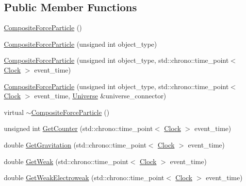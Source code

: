\subsection*{Public Member Functions}
\begin{DoxyCompactItemize}
\item 
\mbox{\hyperlink{class_composite_force_particle_ae00ad8621af6155c86ee3205c1e2afdb}{Composite\+Force\+Particle}} ()
\item 
\mbox{\hyperlink{class_composite_force_particle_a967036ded4212fcd6d4213275145dc50}{Composite\+Force\+Particle}} (unsigned int object\+\_\+type)
\item 
\mbox{\hyperlink{class_composite_force_particle_a805886058bba3179de8142fd266883e4}{Composite\+Force\+Particle}} (unsigned int object\+\_\+type, std\+::chrono\+::time\+\_\+point$<$ \mbox{\hyperlink{universe_8h_a0ef8d951d1ca5ab3cfaf7ab4c7a6fd80}{Clock}} $>$ event\+\_\+time)
\item 
\mbox{\hyperlink{class_composite_force_particle_a8c311b3e35f6def3a532346a50c15281}{Composite\+Force\+Particle}} (unsigned int object\+\_\+type, std\+::chrono\+::time\+\_\+point$<$ \mbox{\hyperlink{universe_8h_a0ef8d951d1ca5ab3cfaf7ab4c7a6fd80}{Clock}} $>$ event\+\_\+time, \mbox{\hyperlink{class_universe}{Universe}} \&universe\+\_\+connector)
\item 
virtual \mbox{\hyperlink{class_composite_force_particle_aa35ee4244375b2bcc5dd775de30aa39e}{$\sim$\+Composite\+Force\+Particle}} ()
\item 
unsigned int \mbox{\hyperlink{class_composite_force_particle_ae0bc57309f04b784b2c23b82db869b25}{Get\+Counter}} (std\+::chrono\+::time\+\_\+point$<$ \mbox{\hyperlink{universe_8h_a0ef8d951d1ca5ab3cfaf7ab4c7a6fd80}{Clock}} $>$ event\+\_\+time)
\item 
double \mbox{\hyperlink{class_composite_force_particle_a06483dc73c156679f34acf85aa5f924e}{Get\+Gravitation}} (std\+::chrono\+::time\+\_\+point$<$ \mbox{\hyperlink{universe_8h_a0ef8d951d1ca5ab3cfaf7ab4c7a6fd80}{Clock}} $>$ event\+\_\+time)
\item 
double \mbox{\hyperlink{class_composite_force_particle_ab5cc0893a4063cc353ea5d2404f27b0b}{Get\+Weak}} (std\+::chrono\+::time\+\_\+point$<$ \mbox{\hyperlink{universe_8h_a0ef8d951d1ca5ab3cfaf7ab4c7a6fd80}{Clock}} $>$ event\+\_\+time)
\item 
double \mbox{\hyperlink{class_composite_force_particle_a27762218af4e3c021c89ff4792d81b41}{Get\+Weak\+Electroweak}} (std\+::chrono\+::time\+\_\+point$<$ \mbox{\hyperlink{universe_8h_a0ef8d951d1ca5ab3cfaf7ab4c7a6fd80}{Clock}} $>$ event\+\_\+time)

\end{DoxyCompactItemize}
